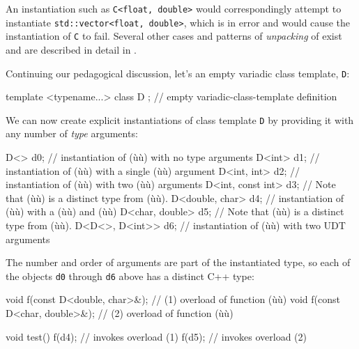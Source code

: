 An instantiation such as \lstinline!C<float,!~\lstinline!double>! would
correspondingly attempt to instantiate
\lstinline!std::vector<float,!~\lstinline!double>!, which is in error and
would cause the instantiation of \lstinline!C! to fail. Several other cases
and patterns of \emph{unpacking} of 
exist and are described in detail in .

Continuing our pedagogical discussion, let's  an empty
variadic class template, \lstinline!D!:

\begin{emcppslisting}[emcppsbatch=e7]
template <typename...> class D { };  // empty variadic-class-template definition
\end{emcppslisting}
    

\noindent We can now create explicit instantiations of class template \lstinline!D!
by providing it with any number of \emph{type} arguments:

\begin{emcppslisting}[emcppsbatch=e7]
D<>               d0;  // instantiation of (ù{}ù) with no type arguments
D<int>            d1;  // instantiation of (ù{}ù) with a single (ù{}ù) argument
D<int, int>       d2;  // instantiation of (ù{}ù) with two (ù{}ù) arguments
D<int, const int> d3;  // Note that (ù{}ù) is a distinct type from (ù{}ù).
D<double, char>   d4;  // instantiation of (ù{}ù) with a (ù{}ù) and (ù{}ù)
D<char, double>   d5;  // Note that (ù{}ù) is a distinct type from (ù{}ù).
D<D<>, D<int>>   d6;   // instantiation of (ù{}ù) with two UDT arguments
\end{emcppslisting}
    

\noindent The number and order of arguments are part of the instantiated type, so
each of the objects \lstinline!d0! through \lstinline!d6! above has a distinct
C++ type:

\begin{emcppslisting}[emcppsbatch=e7]
void f(const D<double, char>&);  // (1) overload of function (ù{}ù)
void f(const D<char, double>&);  // (2) overload of function (ù{}ù)

void test()
{
    f(d4);                           // invokes overload (1)
    f(d5);                           // invokes overload (2)
}
\end{emcppslisting}
    

